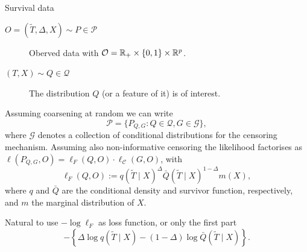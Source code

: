 \documentclass[smaller]{beamer}\usepackage{listings}
\begin{document}
\begin{frame}[label={sec:org31fa036}]{Survival data}
\small

\begin{description}
\item[{\(O = (\tilde T, \Delta, X) \sim P \in \mathcal{P}\)}] Oberved data with \(\mathcal{O} = \mathbb{R}_+
  \times \{0,1\} \times \mathbb{R}^p\).
\item[{\((T, X) \sim Q \in \mathcal{Q}\)}] The distribution \(Q\) (or a feature of it) is of interest.
\end{description}

\vfill

Assuming coarsening at random \citep{gill1997coarsening} we can write
\begin{equation*}
  \mathcal{P} = \{P_{Q, G} : Q \in \mathcal{Q}, G \in \mathcal{G}\},
\end{equation*}
where $\mathcal{G}$ denotes a collection of conditional distributions for the censoring mechanism.
Assuming also non-informative censoring the likelihood factorises as
$\ell(P_{Q, G}, O) = \ell_F(Q, O) \cdot \ell_{\mathcal{C}}(G, O)$, with
\begin{equation*}
  \ell_F(Q, O) := q(\tilde T \mid X)^{\Delta}\bar{Q}(\tilde T \mid X)^{1-\Delta} m(X),
\end{equation*}
where $q$ and $\bar{Q}$ are the conditional density and survivor function, respectively, and $m$ the
marginal distribution of $X$.

\vfill

Natural to use \(-\log\ell_F\) as loss function, or only the first part
\begin{equation*}
  -
  \left\{
    \Delta \log
    q(\tilde T \mid X)
    - (1- \Delta) \log\bar{Q}(\tilde T \mid X)
  \right\}.
\end{equation*}
\end{frame}
\end{document}
